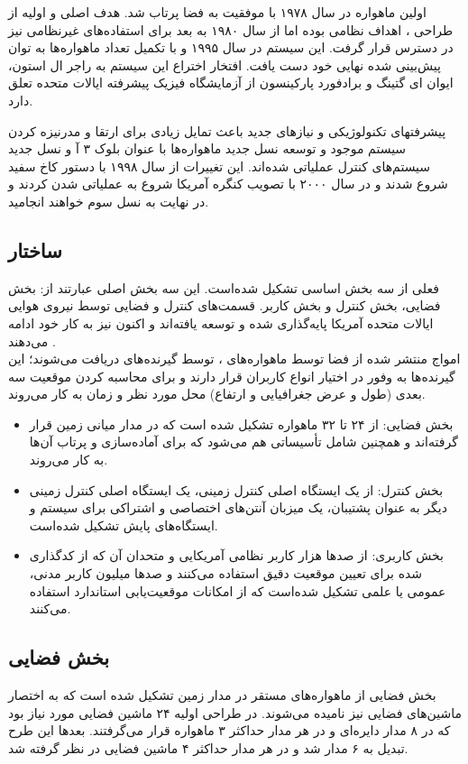 اولین ماهواره  در سال ۱۹۷۸ با موفقیت به فضا پرتاب شد. هدف اصلی و اولیه از طراحی ، اهداف نظامی بوده اما از سال ۱۹۸۰ به بعد برای استفاده‌های غیرنظامی نیز در دسترس قرار گرفت. این سیستم در سال ۱۹۹۵ و با تکمیل تعداد ماهواره‌ها به توان پیش‌بینی شده نهایی خود دست یافت. افتخار اختراع این سیستم به راجر ال استون، ایوان ای گتینگ و برادفورد پارکینسون از آزمایشگاه فیزیک پیشرفته ایالات متحده تعلق دارد.


پیشرفتهای تکنولوژیکی و نیازهای جدید باعث تمایل زیادی برای ارتقا و مدرنیزه کردن سیستم موجود و توسعه نسل جدید ماهواره‌ها با عنوان  بلوک ۳ آ و نسل جدید سیستم‌های کنترل عملیاتی شده‌اند. این تغییرات از سال ۱۹۹۸ با دستور کاخ سفید شروع شدند و در سال ۲۰۰۰ با تصویب کنگره آمریکا شروع به عملیاتی شدن کردند و در نهایت به  نسل سوم خواهند انجامید.
\subsection{ساختار }
 فعلی از سه بخش اساسی تشکیل شده‌است. این سه بخش اصلی عبارتند از: بخش فضایی، بخش کنترل و بخش کاربر. قسمت‌های کنترل و فضایی توسط نیروی هوایی ایالات متحده آمریکا پایه‌گذاری شده و توسعه یافته‌اند و اکنون نیز به کار خود ادامه می‌دهند \cite{phdthesis}. \\
امواج منتشر شده از فضا توسط ماهواره‌های ، توسط گیرنده‌های  دریافت می‌شوند؛ این گیرنده‌ها به وفور در اختیار انواع کاربران قرار دارند و برای محاسبه کردن موقعیت سه بعدی (طول و عرض جغرافیایی و ارتفاع) محل مورد نظر و زمان به کار می‌روند.
\begin{itemize}
	\item
	بخش فضایی: از ۲۴ تا ۳۲ ماهواره تشکیل شده‌ است که در مدار میانی زمین قرار گرفته‌اند و همچنین شامل تأسیساتی هم می‌شود که برای آماده‌سازی و پرتاب آن‌ها به کار می‌روند.
	\item 
	
	بخش کنترل: از یک ایستگاه اصلی کنترل زمینی، یک ایستگاه اصلی کنترل زمینی دیگر به عنوان پشتیبان، یک میزبان آنتن‌های اختصاصی و اشتراکی برای سیستم و ایستگاه‌های پایش تشکیل شده‌است.
	
	\item  
	بخش کاربری: از صدها هزار کاربر نظامی آمریکایی و متحدان آن که از  کدگذاری شده برای تعیین موقعیت دقیق استفاده می‌کنند و صدها میلیون کاربر مدنی، عمومی یا علمی تشکیل شده‌است که از امکانات موقعیت‌یابی استاندارد استفاده می‌کنند.
\end{itemize}
\subsection{بخش فضایی}
بخش فضایی از ماهواره‌های مستقر در مدار زمین تشکیل شده ‌است که به اختصار ماشین‌های فضایی نیز نامیده می‌شوند. در طراحی اولیه  ۲۴ ماشین فضایی مورد نیاز بود که در ۸ مدار دایره‌ای و در هر مدار حداکثر ۳ ماهواره قرار می‌گرفتند. بعدها این طرح تبدیل به ۶ مدار شد و در هر مدار حداکثر ۴ ماشین فضایی در نظر گرفته شد.


